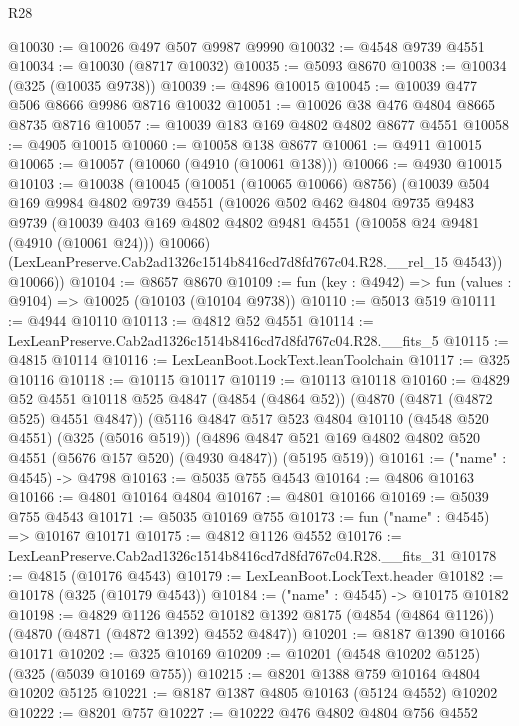 \begin{lexlean}{R28}
\begin{coremodule}
@10030 := @10026 @497 @507 @9987 @9990
@10032 := @4548 @9739 @4551
@10034 := @10030 (@8717 @10032)
@10035 := @5093 @8670
@10038 := @10034 (@325 (@10035 @9738))
@10039 := @4896 @10015
@10045 := @10039 @477 @506 @8666 @9986 @8716 @10032
@10051 := @10026 @38 @476 @4804 @8665 @8735 @8716
@10057 := @10039 @183 @169 @4802 @4802 @8677 @4551
@10058 := @4905 @10015
@10060 := @10058 @138 @8677
@10061 := @4911 @10015
@10065 := @10057 (@10060 (@4910 (@10061 @138)))
@10066 := @4930 @10015
@10103 := @10038
    (@10045
      (@10051 (@10065 @10066) @8756)
      (@10039
        @504
        @169
        @9984
        @4802
        @9739
        @4551
        (@10026
          @502
          @462
          @4804
          @9735
          @9483
          @9739
          (@10039 @403 @169 @4802 @4802 @9481 @4551 (@10058 @24 @9481 (@4910 (@10061 @24))) @10066)
          (LexLeanPreserve.Cab2ad1326c1514b8416cd7d8fd767c04.R28.__rel_15 @4543))
        @10066))
@10104 := @8657 @8670
@10109 := fun (key : @4942) => fun (values : @9104) => @10025 (@10103 (@10104 @9738))
@10110 := @5013 @519
@10111 := @4944 @10110
@10113 := @4812 @52 @4551
@10114 := LexLeanPreserve.Cab2ad1326c1514b8416cd7d8fd767c04.R28.__fits_5
@10115 := @4815 @10114
@10116 := LexLeanBoot.LockText.leanToolchain
@10117 := @325 @10116
@10118 := @10115 @10117
@10119 := @10113 @10118
@10160 := @4829
    @52
    @4551
    @10118
    @525
    @4847
    (@4854 (@4864 @52))
    (@4870 (@4871 (@4872 @525) @4551 @4847))
    (@5116
      @4847
      @517
      @523
      @4804
      @10110
      (@4548 @520 @4551)
      (@325 (@5016 @519))
      (@4896 @4847 @521 @169 @4802 @4802 @520 @4551 (@5676 @157 @520) (@4930 @4847))
      (@5195 @519))
@10161 := ("name" : @4545) -> @4798
@10163 := @5035 @755 @4543
@10164 := @4806 @10163
@10166 := @4801 @10164 @4804
@10167 := @4801 @10166
@10169 := @5039 @755 @4543
@10171 := @5035 @10169 @755
@10173 := fun ("name" : @4545) => @10167 @10171
@10175 := @4812 @1126 @4552
@10176 := LexLeanPreserve.Cab2ad1326c1514b8416cd7d8fd767c04.R28.__fits_31
@10178 := @4815 (@10176 @4543)
@10179 := LexLeanBoot.LockText.header
@10182 := @10178 (@325 (@10179 @4543))
@10184 := ("name" : @4545) -> @10175 @10182
@10198 := @4829
    @1126
    @4552
    @10182
    @1392
    @8175
    (@4854 (@4864 @1126))
    (@4870 (@4871 (@4872 @1392) @4552 @4847))
@10201 := @8187 @1390 @10166 @10171
@10202 := @325 @10169
@10209 := @10201 (@4548 @10202 @5125) (@325 (@5039 @10169 @755))
@10215 := @8201 @1388 @759 @10164 @4804 @10202 @5125
@10221 := @8187 @1387 @4805 @10163 (@5124 @4552) @10202
@10222 := @8201 @757
@10227 := @10222 @476 @4802 @4804 @756 @4552

\end{coremodule}
\end{lexlean}
